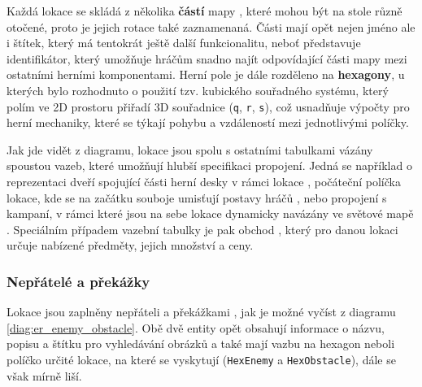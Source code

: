 Každá lokace se skládá z několika \textbf{částí} mapy , které mohou být na stole různě otočené, proto je jejich rotace  také zaznamenaná. Části mají opět nejen jméno ale i štítek, který má tentokrát ještě další funkcionalitu, neboť představuje identifikátor, který umožňuje hráčům snadno najít odpovídající části mapy mezi ostatními herními komponentami. Herní pole je dále rozděleno na \textbf{hexagony}, u kterých bylo rozhodnuto o použití tzv. kubického souřadného systému, který polím ve 2D prostoru přiřadí 3D souřadnice (\texttt{q}, \texttt{r}, \texttt{s}), což usnadňuje výpočty pro herní mechaniky, které se týkají pohybu a vzdáleností mezi jednotlivými políčky.

Jak jde vidět z diagramu, lokace jsou spolu s ostatními tabulkami vázány spoustou vazeb, které umožňují hlubší specifikaci propojení. Jedná se například o reprezentaci dveří spojující části herní desky v rámci lokace , počáteční políčka lokace, kde se na začátku souboje umisťují postavy hráčů , nebo propojení s kampaní, v rámci které jsou na sebe lokace dynamicky navázány ve světové mapě . Speciálním případem vazební tabulky je pak obchod , který pro danou lokaci určuje nabízené předměty, jejich množství a ceny.

\subsubsection*{Nepřátelé a překážky}
\label{subsubsec:schema_enemy_obstacle}

Lokace jsou zaplněny nepřáteli  a překážkami , jak je možné vyčíst z diagramu \ref{diag:er_enemy_obstacle}. Obě dvě entity opět obsahují informace o názvu, popisu a štítku pro vyhledávání obrázků a také mají vazbu na hexagon neboli políčko určité lokace, na které se vyskytují (\texttt{HexEnemy} a \texttt{HexObstacle}), dále se však mírně liší.

